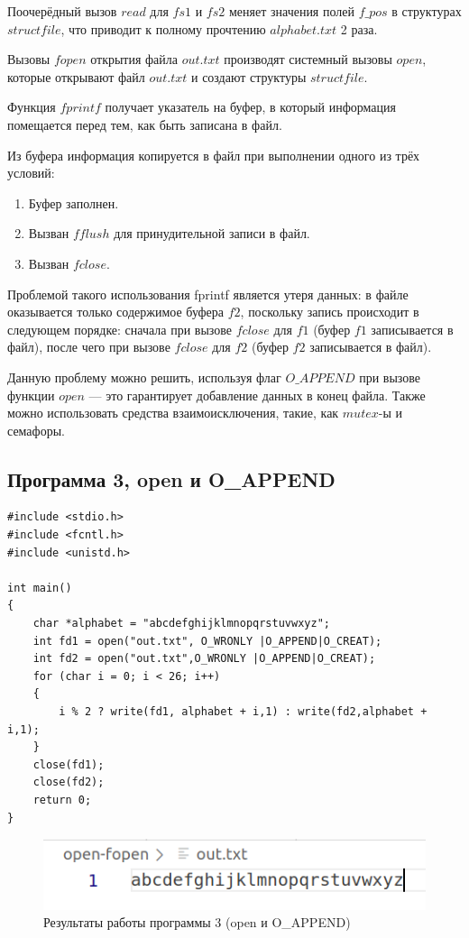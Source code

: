 Поочерёдный вызов $read$ для  $fs1$ и $fs2$ меняет значения полей $f\_pos$ в структурах $struct file$, что приводит к полному прочтению $alphabet.txt$ 2 раза.

Вызовы $fopen$ открытия файла $out.txt$ производят системный вызовы $open$, которые открывают файл $out.txt$ и создают структуры $struct file$.

Функция $fprintf$ получает указатель на буфер, в который информация помещается перед тем, как быть записана в файл.

Из буфера информация копируется в файл при выполнении одного из трёх условий:

\begin{enumerate}
	\item Буфер заполнен.
	\item Вызван $fflush$ для принудительной записи в файл.
	\item Вызван $fclose$.
\end{enumerate}

Проблемой такого использования fprintf является утеря данных: в файле оказывается только содержимое буфера $f2$, поскольку запись происходит в следующем порядке: сначала при вызове $fclose$ для $f1$ (буфер $f1$ записывается в файл), после чего при вызове $fclose$ для $f2$ (буфер $f2$ записывается в файл).

Данную проблему можно решить, используя флаг $O\_APPEND$ при вызове функции $open$ --- это гарантирует добавление данных в конец файла.
Также можно использовать средства взаимоисключения, такие, как $mutex$-ы и семафоры.

\clearpage

\subsection*{Программа 3, open и O\_APPEND}
\begin{center}
	\captionsetup{justification=raggedright,singlelinecheck=off}

\begin{lstlisting}[label=lst:prog3-th-2,caption=Программа 3 --- open]
#include <stdio.h>
#include <fcntl.h>
#include <unistd.h>

int main()
{
    char *alphabet = "abcdefghijklmnopqrstuvwxyz";
    int fd1 = open("out.txt", O_WRONLY |O_APPEND|O_CREAT);
    int fd2 = open("out.txt",O_WRONLY |O_APPEND|O_CREAT);
    for (char i = 0; i < 26; i++)
    {
        i % 2 ? write(fd1, alphabet + i,1) : write(fd2,alphabet + i,1);
    }
    close(fd1);
    close(fd2);
    return 0;
}

\end{lstlisting}
\end{center}


\begin{figure}[h]
	\centering
	\captionsetup{justification=centering}
	\includegraphics[width=150mm]{img/prog3_open.png}
	\caption{Результаты работы программы 3 (open и O\_APPEND)}
	\label{fig:prog-3-open-th-result}
\end{figure}






